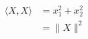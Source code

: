 \documentclass[preview]{standalone}
\begin{document}
\begin{align*}
\langle X , X \rangle & = x_{1}^{2}+x_{2}^{2} \\ & = \lVert X \rVert ^{2}
\end{align*}
\end{document}
